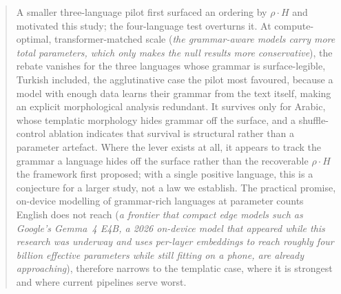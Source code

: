 \begin{abstract}
A smaller three-language pilot first surfaced an ordering by $\rho \cdot H$ and motivated this study; the four-language test overturns it. At compute-optimal, transformer-matched scale (\emph{the grammar-aware models carry more total parameters, which only makes the null results more conservative}), the rebate vanishes for the three languages whose grammar is surface-legible, Turkish included, the agglutinative case the pilot most favoured, because a model with enough data learns their grammar from the text itself, making an explicit morphological analysis redundant. It survives only for Arabic, whose templatic morphology hides grammar off the surface, and a shuffle-control ablation indicates that survival is structural rather than a parameter artefact. Where the lever exists at all, it appears to track the grammar a language hides off the surface rather than the recoverable $\rho \cdot H$ the framework first proposed; with a single positive language, this is a conjecture for a larger study, not a law we establish. The practical promise, on-device modelling of grammar-rich languages at parameter counts English does not reach (\emph{a frontier that compact edge models such as Google's Gemma~4 E4B, a 2026 on-device model that appeared while this research was underway and uses per-layer embeddings to reach roughly four billion effective parameters while still fitting on a phone, are already approaching}), therefore narrows to the templatic case, where it is strongest and where current pipelines serve worst.
\end{abstract}

